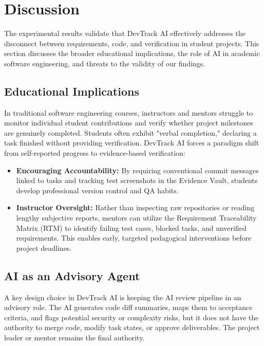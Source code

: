 \section{Discussion}
\label{sec:discussion}

The experimental results validate that DevTrack AI effectively addresses the disconnect between requirements, code, and verification in student projects. This section discusses the broader educational implications, the role of AI in academic software engineering, and threats to the validity of our findings.

\subsection{Educational Implications}

In traditional software engineering courses, instructors and mentors struggle to monitor individual student contributions and verify whether project milestones are genuinely completed. Students often exhibit "verbal completion," declaring a task finished without providing verification. DevTrack AI forces a paradigm shift from self-reported progress to evidence-based verification:
\begin{itemize}
    \item \textbf{Encouraging Accountability:} By requiring conventional commit messages linked to tasks and tracking test screenshots in the Evidence Vault, students develop professional version control and QA habits.
    \item \textbf{Instructor Oversight:} Rather than inspecting raw repositories or reading lengthy subjective reports, mentors can utilize the Requirement Traceability Matrix (RTM) to identify failing test cases, blocked tasks, and unverified requirements. This enables early, targeted pedagogical interventions before project deadlines.
\end{itemize}

\subsection{AI as an Advisory Agent}

A key design choice in DevTrack AI is keeping the AI review pipeline in an advisory role. The AI generates code diff summaries, maps them to acceptance criteria, and flags potential security or complexity risks, but it does not have the authority to merge code, modify task states, or approve deliverables. The project leader or mentor remains the final authority.

